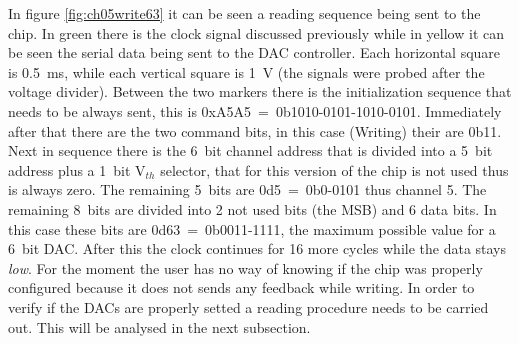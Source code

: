 \noindent In figure \ref{fig:ch05write63} it can be seen a reading sequence being sent to the chip. In green there is the clock signal discussed previously while in yellow it can be seen the serial data being sent to the DAC controller.
Each horizontal square is 0.5~ms, while each vertical square is 1~V (the signals were probed after the voltage divider). 
Between the two markers there is the initialization sequence that needs to be always sent, this is 0xA5A5~=~0b1010-0101-1010-0101.
Immediately after that there are the two command bits, in this case (Writing) their are 0b11.
Next in sequence there is the 6~bit channel address that is divided into a 5~bit address plus a 1~bit V$_{th}$ selector, that for this version of the chip is not used thus is always zero.
The remaining 5~bits are 0d5~=~0b0-0101 thus channel 5. The remaining 8~bits are divided into 2 not used bits (the MSB) and 6 data bits.
In this case these bits are 0d63~=~0b0011-1111, the maximum possible value for a 6~bit DAC.
After this the clock continues for 16 more cycles while the data stays \textit{low}.
For the moment the user has no way of knowing if the chip was properly configured because it does not sends any feedback while writing. In order to verify if the DACs are properly setted a reading procedure needs to be carried out. This will be analysed in the next subsection.  

